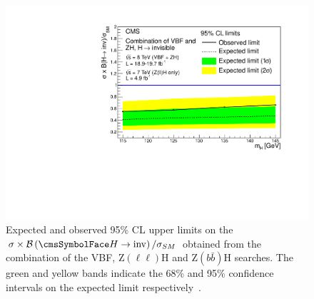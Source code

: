 \begin{figure}
  \includegraphics[width=\largefigwidth]{plots/prompt/HIG-13-30-figs/combinedlimit.pdf}
  \caption[Expected and observed 95\% CL upper limits on the $\sigma\times\BRinv/\sigma_{SM}$ obtained from the combination of the VBF, Z$(\ell\ell)$H and Z$(b\bar{b})$H searches. The green and yellow bands indicate the 68\% and 95\% confidence intervals on the expected limit respectively.]{Expected and observed 95\% CL upper limits on the $\sigma\times\BRinv/\sigma_{SM}$ obtained from the combination of the VBF, Z$(\ell\ell)$H and Z$(b\bar{b})$H searches. The green and yellow bands indicate the 68\% and 95\% confidence intervals on the expected limit respectively~\cite{Chatrchyan:2014tja}.}
  \label{fig:promptcomb}
\end{figure}

